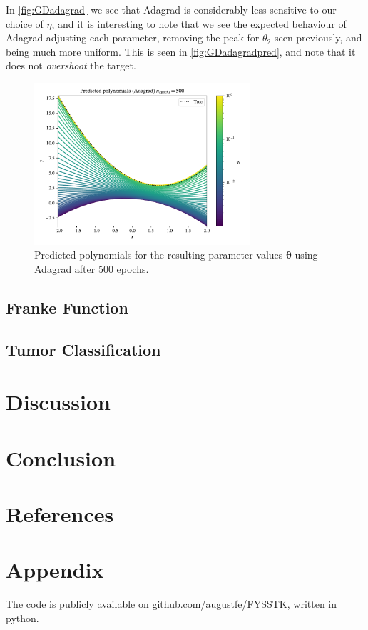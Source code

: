 \documentclass{article}
\theoremstyle{definition}
\begin{document}
In \autoref{fig:GDadagrad} we see that Adagrad is considerably less sensitive to our choice of $\eta$, and it is interesting to note that we see the expected behaviour of Adagrad adjusting each parameter, removing the peak for $\theta_2$ seen previously, and being much more uniform. This is seen in \autoref{fig:GDadagradpred}, and note that it does not \textit{overshoot} the target.

\begin{figure}[H]%
    \centering
    \includegraphics[width=8cm]{Project2/figures/polynomial_grad/OLS_autodiff/adagrad_prediction.pdf}
    \caption{Predicted polynomials for the resulting parameter values $\boldsymbol{\theta}$ using Adagrad after 500 epochs.}
    \label{fig:GDadagradpred}
\end{figure}

\newpage

\subsection{Franke Function}

\subsection{Tumor Classification}

\newpage
\section{Discussion}

\section{Conclusion}

\section{References}

\printbibliography

\section{Appendix}
The code is publicly available on \href{https://github.com/augustfe/FYSSTK}{github.com/augustfe/FYSSTK}, written in python.
\end{document}
